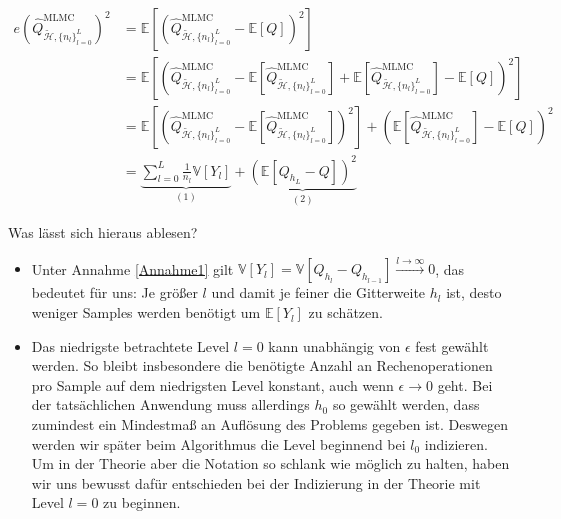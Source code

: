 \begin{align}
e(\widehat{Q}_{\tilde{\mathcal{H}},\{ n_l \}_{l=0}^L }^{\text{MLMC}})^2 &= \mathbb{E}  \left[ (\widehat{Q}_{\tilde{\mathcal{H}},\{ n_l \}_{l=0}^L }^{\text{MLMC}}- \mathbb{E}[Q])^2 \right] \nonumber \\
&= \mathbb{E}  \left[ (\widehat{Q}_{\tilde{\mathcal{H}},\{ n_l \}_{l=0}^L }^{\text{MLMC}} - \mathbb{E}[\widehat{Q}_{\tilde{\mathcal{H}},\{ n_l \}_{l=0}^L }^{\text{MLMC}}]+\mathbb{E}[\widehat{Q}_{\tilde{\mathcal{H}},\{ n_l \}_{l=0}^L }^{\text{MLMC}}]- \mathbb{E}[Q])^2 \right] \nonumber \\
&= \mathbb{E} \left[  (\widehat{Q}_{\tilde{\mathcal{H}},\{ n_l \}_{l=0}^L }^{\text{MLMC}}-\mathbb{E}[\widehat{Q}_{\tilde{\mathcal{H}},\{ n_l \}_{l=0}^L }^{\text{MLMC}}])^2 \right] +  \left(  \mathbb{E}[\widehat{Q}_{\tilde{\mathcal{H}},\{ n_l \}_{l=0}^L }^{\text{MLMC}}] - \mathbb{E}[Q] \right)^2 \nonumber \\
&= \underbrace{\sum_{l=0}^L \frac{1}{n_l} \mathbb{V}[Y_l]}_{(1)} + \underbrace{\left( \mathbb{E}[Q_{h_L}-Q] \right)^2}_{(2)}
\end{align}
\begin{Bemerkung}Was lässt sich hieraus ablesen?
	\begin{itemize}
		\item Unter Annahme \ref{Annahme1} gilt $ \mathbb{V}[Y_l] = \mathbb{V}[Q_{h_l}-Q_{h_{l-1}}] \stackrel{l \to \infty}{\to} 0  $, das bedeutet für uns: Je größer $ l $ und damit je feiner die Gitterweite $ h_l $ ist, desto weniger Samples werden benötigt um $ \mathbb{E}[Y_l] $ zu schätzen.
		\item Das niedrigste betrachtete Level $ l = 0 $ kann unabhängig von $ \epsilon $ fest gewählt werden. So bleibt insbesondere die benötigte Anzahl an Rechenoperationen pro Sample auf dem niedrigsten Level konstant, auch wenn $ \epsilon \to 0 $ geht. Bei der tatsächlichen Anwendung muss allerdings $ h_0 $ so gewählt werden, dass zumindest ein Mindestmaß an Auflösung des Problems gegeben ist. Deswegen werden wir später beim Algorithmus die Level beginnend bei $ l_0 $ indizieren. Um in der Theorie aber die Notation so schlank wie möglich zu halten, haben wir uns bewusst dafür entschieden bei der Indizierung in der Theorie mit Level $ l=0 $ zu beginnen.
	\end{itemize}
\end{Bemerkung} 

